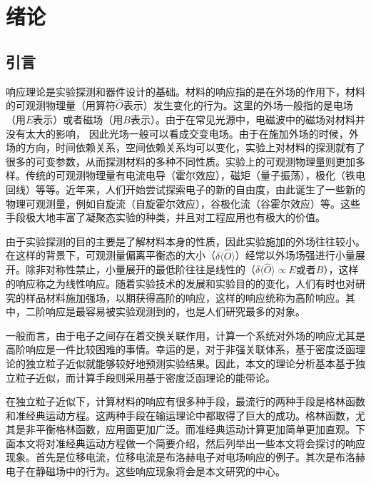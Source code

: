 \chapter{绪论}
\label{cha:intro}

\section{引言}

响应理论是实验探测和器件设计的基础。材料的响应指的是在外场的作用下，材料的可观测物理量（用算符$\hat{O}$表示）发生变化的行为。这里的外场一般指的是电场（用$E$表示）或者磁场（用$B$表示）。由于在常见光源中，电磁波中的磁场对材料并没有太大的影响， 因此光场一般可以看成交变电场。由于在施加外场的时候，外场的方向，时间依赖关系，空间依赖关系均可以变化，实验上对材料的探测就有了很多的可变参数，从而探测材料的多种不同性质。实验上的可观测物理量则更加多样。传统的可观测物理量有电流电导（霍尔效应\cite{klitzing_new_1980}），磁矩（量子振荡\cite{SdH,dHvA}），极化（铁电回线\cite{cohen_origin_1992}）等等。近年来，人们开始尝试探索电子的新的自由度，由此诞生了一些新的物理可观测量，例如自旋流（自旋霍尔效应\cite{hasan2010,qi2011}），谷极化流（谷霍尔效应\cite{xiao_coupled_2012}）等。这些手段极大地丰富了凝聚态实验的种类，并且对工程应用也有极大的价值。


由于实验探测的目的主要是了解材料本身的性质，因此实验施加的外场往往较小。在这样的背景下，可观测量偏离平衡态的大小（$\delta\langle\hat{O}\rangle$）经常以外场场强进行小量展开。除非对称性禁止，小量展开的最低阶往往是线性的（$\delta\langle\hat{O}\rangle \propto E$或者$B$），这样的响应称之为线性响应。随着实验技术的发展和实验目的的变化，人们有时也对研究的样品材料施加强场，以期获得高阶的响应，这样的响应统称为高阶响应。其中，二阶响应是最容易被实验观测到的，也是人们研究最多的对象。

一般而言，由于电子之间存在着交换关联作用，计算一个系统对外场的响应尤其是高阶响应是一件比较困难的事情。幸运的是，对于非强关联体系，基于密度泛函理论的独立粒子近似就能够较好地预测实验结果。因此，本文的理论分析基本基于独立粒子近似，而计算手段则采用基于密度泛函理论的能带论。

在独立粒子近似下，计算材料的响应有很多种手段，最流行的两种手段是格林函数和准经典运动方程\cite{xiao_berry_2010}。这两种手段在输运理论中都取得了巨大的成功。格林函数，尤其是非平衡格林函数，应用面更加广泛。而准经典运动计算更加简单更加直观。下面本文将对准经典运动方程做一个简要介绍，然后列举出一些本文将会探讨的响应现象。首先是位移电流\cite{sipe_second-order_2000,von_baltz_theory_1981}，位移电流是布洛赫电子对电场响应的例子。其次是布洛赫电子在静磁场中的行为。这些响应现象将会是本文研究的中心。

